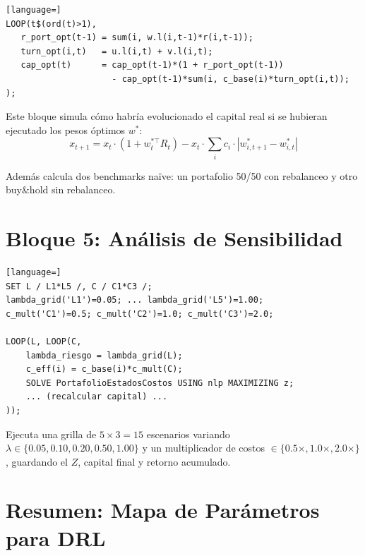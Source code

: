 \documentclass[11pt,a4paper]{article}
\begin{document}
\begin{lstlisting}[language=]
LOOP(t$(ord(t)>1),
   r_port_opt(t-1) = sum(i, w.l(i,t-1)*r(i,t-1));
   turn_opt(i,t)   = u.l(i,t) + v.l(i,t);
   cap_opt(t)      = cap_opt(t-1)*(1 + r_port_opt(t-1))
                     - cap_opt(t-1)*sum(i, c_base(i)*turn_opt(i,t));
);
\end{lstlisting}

Este bloque simula cómo habría evolucionado el capital real si se hubieran ejecutado los pesos óptimos $w^*$:
\begin{equation}
    x_{t+1} = x_t \cdot (1 + w_t^{*\top} R_t) - x_t \cdot \sum_i c_i \cdot |w_{i,t+1}^* - w_{i,t}^*|
\end{equation}

Además calcula dos benchmarks naïve: un portafolio 50/50 con rebalanceo y otro buy\&hold sin rebalanceo.

\section{Bloque 5: Análisis de Sensibilidad}

\begin{lstlisting}[language=]
SET L / L1*L5 /, C / C1*C3 /;
lambda_grid('L1')=0.05; ... lambda_grid('L5')=1.00;
c_mult('C1')=0.5; c_mult('C2')=1.0; c_mult('C3')=2.0;

LOOP(L, LOOP(C,
    lambda_riesgo = lambda_grid(L);
    c_eff(i) = c_base(i)*c_mult(C);
    SOLVE PortafolioEstadosCostos USING nlp MAXIMIZING z;
    ... (recalcular capital) ...
));
\end{lstlisting}

Ejecuta una grilla de $5 \times 3 = 15$ escenarios variando $\lambda \in \{0.05, 0.10, 0.20, 0.50, 1.00\}$ y un multiplicador de costos $\in \{0.5\times, 1.0\times, 2.0\times\}$, guardando el $Z$, capital final y retorno acumulado.

\section{Resumen: Mapa de Parámetros para DRL}
\end{document}
